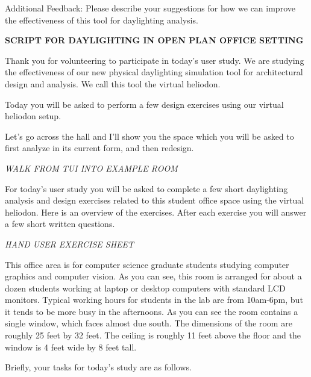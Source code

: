 \documentclass[12pt]{article}
\begin{document}
Additional Feedback: Please describe your suggestions for how we can
improve the effectiveness of this tool for daylighting analysis.
\vspace{1.7in}





\renewcommand\arraystretch{1.0}


{\bf SCRIPT FOR DAYLIGHTING IN OPEN PLAN OFFICE SETTING}
\vspace{0.1in}

Thank you for volunteering to participate in today's user study.  We
are studying the effectiveness of our new physical daylighting
simulation tool for architectural design and analysis.  We call this
tool the virtual heliodon.

Today you will be asked to perform a few design exercises using our
virtual heliodon setup.  

Let's go across the hall and I'll show you the space which you will be
asked to first analyze in its current form, and then redesign.

{\em WALK FROM TUI INTO EXAMPLE ROOM }

For today's user study you will be asked to complete a few short
daylighting analysis and design exercises related to this student
office space using the virtual heliodon.  Here is an overview of the
exercises.  After each exercise you will answer a few short written
questions.

{\em HAND USER EXERCISE SHEET }

This office area is for computer science graduate students studying
computer graphics and computer vision.  As you can see, this room is
arranged for about a dozen students working at laptop or desktop
computers with standard LCD monitors.  Typical working hours for
students in the lab are from 10am-6pm, but it tends to be more busy in
the afternoons.  As you can see the room contains a single window,
which faces almost due south.  The dimensions of the room are roughly
25 feet by 32 feet.  The ceiling is roughly 11 feet above the floor
and the window is 4 feet wide by 8 feet tall.

\newpage 

Briefly, your tasks for today's study are as follows. 
\end{document}
